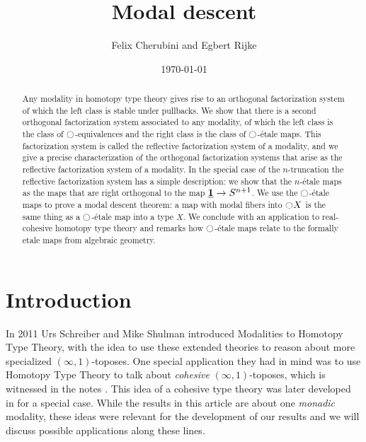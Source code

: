 \documentclass[9pt,twosided]{amsart}
\title{Modal descent}
\author{Felix Cherubini and Egbert Rijke}
\date{\today}
\begin{document}
\maketitle

\begin{abstract}
  Any modality in homotopy type theory gives rise to an orthogonal factorization system of which the left class is stable under pullbacks. We show that there is a second orthogonal factorization system associated to any modality, of which the left class is the class of ${\ocircle}$-equivalences and the right class is the class of ${\ocircle}$-\'etale maps. This factorization system is called the reflective factorization system of a modality, and we give a precise characterization of the orthogonal factorization systems that arise as the reflective factorization system of a modality. In the special case of the $n$-truncation the reflective factorization system has a simple description: we show that the $n$-\'etale maps as the maps that are right orthogonal to the map $\underline{\mathbf{1}} \to S^{n+1}$. We use the ${\ocircle}$-\'etale maps to prove a modal descent theorem: a map with modal fibers into ${\ocircle} X$ is the same thing as a ${\ocircle}$-\'etale map into a type $X$. We conclude with an application to real-cohesive homotopy type theory and remarks how ${\ocircle}$-étale maps relate to the formally etale maps from algebraic geometry. 
\end{abstract}

\section{Introduction}
In 2011 Urs Schreiber and Mike Shulman introduced Modalities to Homotopy Type Theory,
with the idea to use these extended theories to reason about more specialized $(\infty,1)$-toposes.
One special application they had in mind was to use Homotopy Type Theory to talk about \emph{cohesive} $(\infty,1)$-toposes,
which is witnessed in the notes \cite{ShulmanSchreiber}.
This idea of a cohesive type theory was later developed in \cite{ShulmanRealCohesion} for a special case.
While the results in this article are about one \emph{monadic} modality,
these ideas were relevant for the development of our results and we will discuss possible applications along these lines.
  
\end{document}
